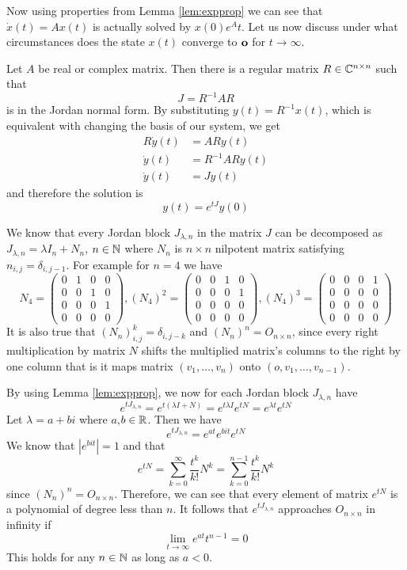 Now using properties from Lemma \ref{lem:expprop} we can see that $\dot{x}(t)=Ax(t)$ is actually solved by $x(0)e^At$. Let us now discuss under what circumstances does the state $x(t)$ converge to $\textbf{o}$ for $t\rightarrow\infty$. 

Let $A$ be real or complex matrix. Then there is a regular matrix $R\in \mathbb{C}^{n\times n}$ such that $$J=R^{-1}AR$$ is in the Jordan normal form. By substituting $y(t)=R^{-1}x(t)$, which is equivalent with changing the basis of our system, we get 
\begin{align*}
	R\dot{y}(t)&=ARy(t) \\
	\dot{y}(t)&=R^{-1}ARy(t) \\
	\dot{y}(t)&=Jy(t)
\end{align*}
 and therefore the solution is $$y(t)=e^{tJ}y(0)$$ 

We know that every Jordan block $J_{\lambda,n}$ in the matrix $J$ can be decomposed as $J_{\lambda,n}=\lambda I_n+N_n$, $n \in\mathbb{N}$ where $N_n$ is $n \times n$ nilpotent matrix satisfying $n_{i,j}=\delta_{i,j-1}$. For example for $n=4$ we have
\begin{equation*}
	N_4=
	\begin{pmatrix}
		0 & 1 & 0 & 0 \\
		0 & 0 & 1 & 0 \\
		0 & 0 & 0 & 1 \\
		0 & 0 & 0 & 0 
	\end{pmatrix},
	(N_4)^2=
	\begin{pmatrix}
		0 & 0 & 1 & 0 \\
		0 & 0 & 0 & 1 \\
		0 & 0 & 0 & 0 \\
		0 & 0 & 0 & 0 
	\end{pmatrix},
	(N_4)^3=
	\begin{pmatrix}
		0 & 0 & 0 & 1 \\
		0 & 0 & 0 & 0 \\
		0 & 0 & 0 & 0 \\
		0 & 0 & 0 & 0 
	\end{pmatrix}
\end{equation*}
It is also true that $(N_n)^k_{i,j}=\delta_{i,j-k}$ and $(N_n)^n=O_{n \times n}$, since every right multiplication by matrix $N$ shifts the multiplied matrix's columns to the right by one column that is it maps matrix $(v_1,\ldots,v_n)$ onto $(o,v_1,\ldots,v_{n-1})$. 

By using Lemma \ref{lem:expprop}, we now for each Jordan block $J_{\lambda,n}$ have $$e^{tJ_{\lambda,n}}=e^{t(\lambda I + N)}=e^{t\lambda I}e^{tN}=e^{\lambda t}e^{tN}$$ Let $\lambda = a+bi$ where $a$,$b \in \mathbb{R}$. Then we have $$e^{tJ_{\lambda,n}}=e^{at}e^{bit}e^{tN}$$ We know that $|e^{bit}|=1$ and that $$e^{tN}=\sum^\infty_{k=0}\frac{t^k}{k!}N^k=\sum^{n-1}_{k=0}\frac{t^k}{k!}N^k$$ since $(N_n)^n=O_{n \times n}$. Therefore, we can see that every element of matrix $e^{tN}$ is a polynomial of degree less than $n$. It follows that $e^{tJ_{\lambda,n}}$ approaches $O_{n \times n}$ in infinity if $$\lim_{t\to\infty}e^{at}t^{n-1}=0$$ This holds for any $n\in\mathbb{N}$ as long as $a<0$. 

